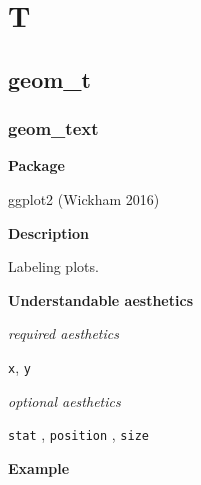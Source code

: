 \documentclass[
  letterpaper,
  DIV=11,
  numbers=noendperiod]{scrreprt}
\begin{document}
\part{T}

\chapter{geom\_t}\label{sec-t}

\section{geom\_text}\label{text}

\textbf{Package}

ggplot2 (Wickham 2016)

\textbf{Description}

Labeling plots.

\textbf{Understandable aesthetics}

\emph{required aesthetics}

\texttt{x}, \texttt{y}

\emph{optional aesthetics}

\texttt{stat} , \texttt{position} , \texttt{size}

\textbf{Example}
\end{document}
